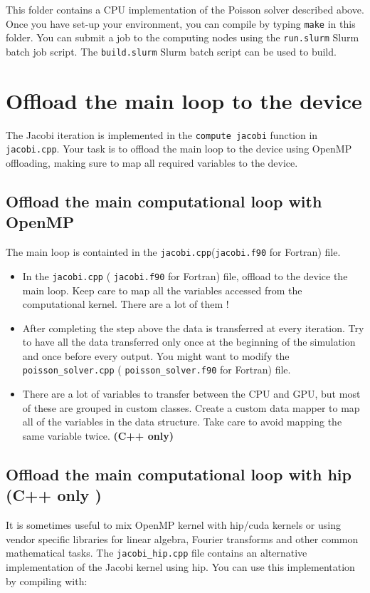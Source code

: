 \documentclass{article}
\begin{document}
This folder contains a CPU implementation of the Poisson solver described above. 
Once you have set-up your environment, you can compile by typing \texttt{make} in this folder.
You can submit a job to the computing nodes using the \texttt{run.slurm} Slurm batch job script.
The \texttt{build.slurm} Slurm batch script can be used to build.


\section{Offload the main loop to the device}

The Jacobi iteration is implemented in the \texttt{compute jacobi} function in \texttt{jacobi.cpp}.
Your task is to offload the main loop to the device using OpenMP offloading, making sure to map all required variables to the device.

\subsection{Offload the main computational loop with OpenMP}
The main loop is containted in the \texttt{jacobi.cpp}(\texttt{jacobi.f90} for Fortran) file.
\begin{itemize}
    \item In the \texttt{jacobi.cpp} ( \texttt{jacobi.f90} for Fortran) file, offload to the device the main loop. Keep care to map all the variables accessed from the computational kernel. There are a lot of them !
    \item After completing the step above the data is transferred at every iteration. Try to have all the data transferred only once at the beginning of the simulation and once before every output. You might want to modify the \texttt{poisson\_solver.cpp} ( \texttt{poisson\_solver.f90} for Fortran) file.
    \item There are a lot of variables to transfer between the CPU and GPU, but most of these are grouped in custom classes. Create a custom data mapper to map all of the variables in the data structure. Take care to avoid mapping the same variable twice.  \textbf{(C++ only)}
    
\end{itemize}
    
\subsection{Offload the main computational loop with hip (C++ only )}
It is sometimes useful to mix OpenMP kernel with hip/cuda kernels or using vendor specific libraries for linear algebra, Fourier transforms and other common mathematical tasks. 
The \texttt{jacobi\_hip.cpp} file contains an alternative implementation of the Jacobi kernel using hip. You can use this implementation by compiling with: 
\end{document}

